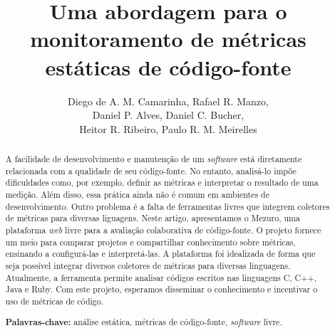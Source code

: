 \documentclass{llncs}
\begin{document}
\sloppy
\title{Uma abordagem para o monitoramento de métricas estáticas de código-fonte}

\author{Diego de A. M. Camarinha, Rafael R. Manzo,\\
        Daniel P. Alves, Daniel C. Bucher, \\
        Heitor R. Ribeiro, Paulo R. M. Meirelles}


\maketitle
\begin{abstract}
  A facilidade de desenvolvimento e manutenção de um \textit{software} está diretamente relacionada com a qualidade de seu código-fonte.
  No entanto, analisá-lo impõe dificuldades como, por exemplo, definir as métricas e interpretar o resultado de uma medição. Além disso, essa prática ainda não é comum em ambientes de desenvolvimento. Outro problema é a falta de ferramentas livres que integrem coletores de métricas para diversas liguagens.
  Neste artigo, apresentamos o Mezuro, uma plataforma \textit{web} livre para a avaliação colaborativa de código-fonte. O projeto fornece um meio para comparar projetos e compartilhar conhecimento sobre métricas, ensinando a configurá-las e interpretá-las. A plataforma foi idealizada de forma que seja possível integrar diversos coletores de métricas para diversas linguagens. Atualmente, a ferramenta permite analisar códigos escritos nas linguagens C, C++, Java e Ruby.
  Com este projeto, esperamos disseminar o conhecimento e incentivar o uso de métricas de código.

\textbf{Palavras-chave:} análise estática, métricas de código-fonte, \textit{software} livre.
\end{abstract}
\end{document}
